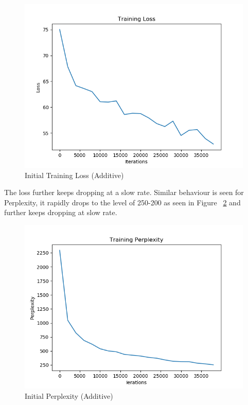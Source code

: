 \documentclass[11pt,a4paper]{article}
\begin{document}
\begin{figure}[!htbp]
\includegraphics[width=\linewidth]{hi_add_loss_1.png}
\caption{Initial Training Loss (Additive)}
\label{fig9}
\end{figure}

The loss further keeps dropping at a slow rate. Similar behaviour is seen for Perplexity, it rapidly drops to the level of 250-200 as seen in Figure ~\ref{fig11} and further keeps dropping at slow rate.


\begin{figure}[!htbp]
\includegraphics[width=\linewidth]{hi_add_ppl_1.png}
\caption{Initial Perplexity (Additive)}
\label{fig11}
\end{figure}
\end{document}
